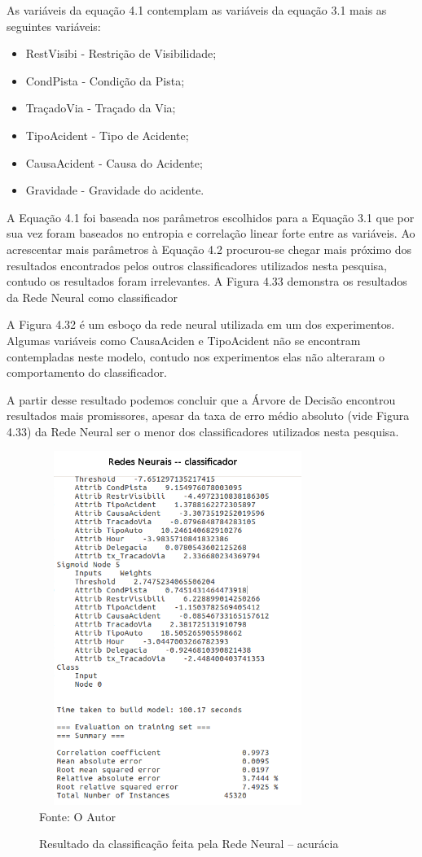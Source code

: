 As variáveis da equação 4.1 contemplam as variáveis da equação 3.1 mais as seguintes variáveis:

\begin{itemize}
	\item RestVisibi   - Restrição de Visibilidade;
	\item CondPista    - Condição da Pista;
	\item TraçadoVia   - Traçado da Via;
	\item TipoAcident  - Tipo de Acidente;
	\item CausaAcident - Causa do Acidente;
	\item Gravidade    - Gravidade do acidente.
\end{itemize}

A Equação 4.1 foi baseada nos parâmetros escolhidos para a Equação 3.1 que por sua vez foram baseados no entropia e correlação linear forte entre as variáveis. Ao acrescentar mais parâmetros à Equação 4.2 procurou-se chegar mais próximo dos resultados encontrados pelos outros classificadores utilizados nesta pesquisa, contudo os resultados foram irrelevantes. A Figura 4.33 demonstra os resultados da Rede Neural como classificador

A Figura 4.32 é um esboço da rede neural utilizada em um dos experimentos. Algumas variáveis como CausaAciden e TipoAcident não se encontram contempladas neste modelo, contudo nos experimentos elas não alteraram o comportamento do classificador.

A partir desse resultado podemos concluir que a Árvore de Decisão encontrou resultados mais promissores, apesar da taxa de erro médio absoluto (vide Figura 4.33) da Rede Neural ser o menor dos classificadores utilizados nesta pesquisa.

\begin{figure}[!ht]
	\centering
	\caption{Resultado da classificação feita pela Rede Neural -- acurácia}
	\includegraphics[width=90mm, height=115mm]{Figuras/Resultados/RNN}\\
	\tiny Fonte: O Autor
	\label{fig:RNN}
\end{figure}


